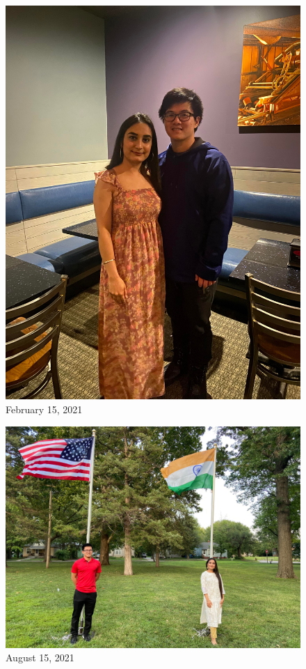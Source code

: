 \documentclass[
]{book}
\begin{document}
\begin{figure}
\centering
\includegraphics[width=5.20833in,height=\textheight]{mimages/16 2-16-2021.jpg}
\caption{February 15, 2021}
\end{figure}

\begin{figure}
\centering
\includegraphics[width=5.20833in,height=\textheight]{mimages/12.1 8-15-2021.jpg}
\caption{August 15, 2021}
\end{figure}
\end{document}
